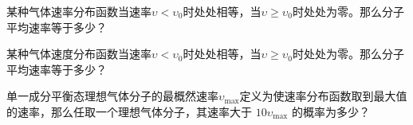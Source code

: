 \documentclass[CJK]{beamer}
\begin{document}
\begin{frame}
  \bchL
某种气体速率分布函数当速率$\upsilon<\upsilon_0$时处处相等，当$\upsilon\ge\upsilon_0$时处处为零。那么分子平均速率等于多少？  
  \echL
\end{frame}


\begin{frame}
  \bchL
某种气体速度分布函数当速率$\upsilon<\upsilon_0$时处处相等，当$\upsilon\ge\upsilon_0$时处处为零。那么分子平均速率等于多少？  
  \echL
\end{frame}

\begin{frame}
  \bchL
  单一成分平衡态理想气体分子的最概然速率$\upsilon_{\max}$定义为使速率分布函数取到最大值的速率，那么任取一个理想气体分子，其速率大于 $10\upsilon_{\max}$ 的概率为多少？
  \echL
\end{frame}
\end{document}
